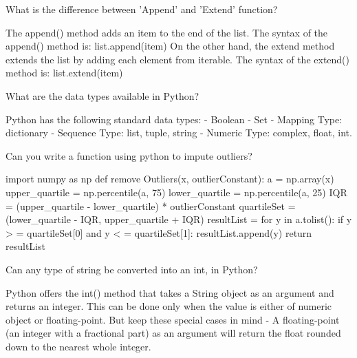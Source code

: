 	\begin{qanda}
		\begin{question}
What is the difference between 'Append' and 'Extend' function?
		\end{question}
		\begin{answer}
The append() method adds an item to the end of the list. The syntax of the append() method is: list.append(item) On the other hand, the extend method extends the list by adding each element from iterable. The syntax of the extend() method is: list.extend(item)
		\end{answer}
	\end{qanda}

	\begin{qanda}
		\begin{question}
What are the data types available in Python?
		\end{question}
		\begin{answer}
Python has the following standard data types: - Boolean - Set - Mapping Type: dictionary - Sequence Type: list, tuple, string - Numeric Type: complex, float, int.
		\end{answer}
	\end{qanda}

	\begin{qanda}
		\begin{question}
Can you write a function using python to impute outliers?
		\end{question}
		\begin{answer}
import numpy as np def remove Outliers(x, outlierConstant): a = np.array(x) upper\_quartile = np.percentile(a, 75) lower\_quartile = np.percentile(a, 25) IQR = (upper\_quartile - lower\_quartile) * outlierConstant quartileSet = (lower\_quartile - IQR, upper\_quartile + IQR) resultList = for y in a.tolist(): if y > = quartileSet[0] and y < = quartileSet[1]: resultList.append(y) return resultList
		\end{answer}
	\end{qanda}

	\begin{qanda}
		\begin{question}
Can any type of string be converted into an int, in Python?
		\end{question}
		\begin{answer}
Python offers the int() method that takes a String object as an argument and returns an integer. This can be done only when the value is either of numeric object or floating-point. But keep these special cases in mind - A floating-point (an integer with a fractional part) as an argument will return the float rounded down to the nearest whole integer.
		\end{answer}
	\end{qanda}

